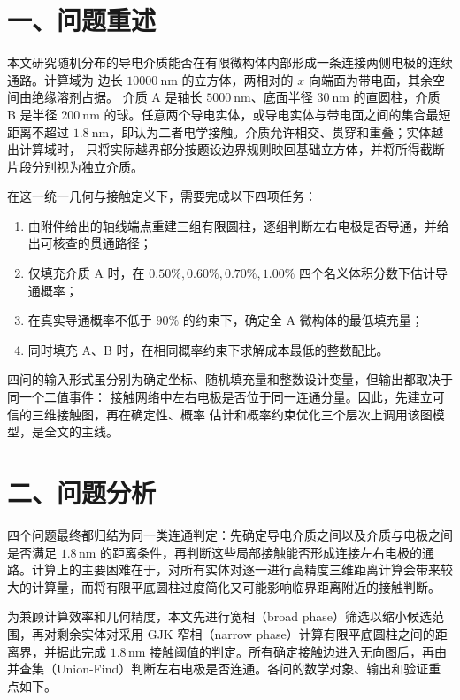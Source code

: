 \section{一、问题重述}\label{ux4e00ux95eeux9898ux91cdux8ff0}

本文研究随机分布的导电介质能否在有限微构体内部形成一条连接两侧电极的连续通路。计算域为 边长 \(10000\ \mathrm{nm}\) 的立方体，两相对的 \(x\) 向端面为带电面，其余空间由绝缘溶剂占据。 介质 A 是轴长 \(5000\ \mathrm{nm}\)、底面半径 \(30\ \mathrm{nm}\) 的直圆柱，介质 B 是半径 \(200\ \mathrm{nm}\) 的球。任意两个导电实体，或导电实体与带电面之间的集合最短距离不超过 \(1.8\ \mathrm{nm}\)，即认为二者电学接触。介质允许相交、贯穿和重叠；实体越出计算域时， 只将实际越界部分按题设边界规则映回基础立方体，并将所得截断片段分别视为独立介质。

在这一统一几何与接触定义下，需要完成以下四项任务：

\begin{enumerate}
\def\labelenumi{\arabic{enumi}.}
\tightlist
\item
  由附件给出的轴线端点重建三组有限圆柱，逐组判断左右电极是否导通，并给出可核查的贯通路径；
\item
  仅填充介质 A 时，在 \(0.50\%,0.60\%,0.70\%,1.00\%\) 四个名义体积分数下估计导通概率；
\item
  在真实导通概率不低于 \(90\%\) 的约束下，确定全 A 微构体的最低填充量；
\item
  同时填充 A、B 时，在相同概率约束下求解成本最低的整数配比。
\end{enumerate}

四问的输入形式虽分别为确定坐标、随机填充量和整数设计变量，但输出都取决于同一个二值事件： 接触网络中左右电极是否位于同一连通分量。因此，先建立可信的三维接触图，再在确定性、概率 估计和概率约束优化三个层次上调用该图模型，是全文的主线。

\section{二、问题分析}\label{ux4e8cux95eeux9898ux5206ux6790}

四个问题最终都归结为同一类连通判定：先确定导电介质之间以及介质与电极之间是否满足 \(1.8\,\mathrm{nm}\) 的距离条件，再判断这些局部接触能否形成连接左右电极的通路。计算上的主要困难在于，对所有实体对逐一进行高精度三维距离计算会带来较大的计算量，而将有限平底圆柱过度简化又可能影响临界距离附近的接触判断。

为兼顾计算效率和几何精度，本文先进行宽相（broad phase）筛选以缩小候选范围，再对剩余实体对采用 GJK 窄相（narrow phase）计算有限平底圆柱之间的距离界，并据此完成 \(1.8\,\mathrm{nm}\) 接触阈值的判定。所有确定接触边进入无向图后，再由并查集（Union-Find）判断左右电极是否连通。各问的数学对象、输出和验证重点如下。

